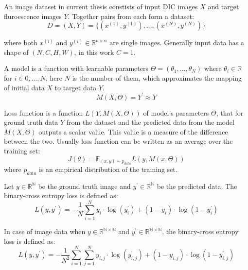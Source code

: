 \begin{definition}
	An image dataset in current thesis constists of input DIC images $X$ and target fluroescence images $Y$. Together pairs from each form a dataset:
	\begin{equation}
		D = (X, Y) = \{(x^{(1)}, y^{(1)}), \dots, (x^{(N)}, y^{(N)})\}
	\end{equation}

	where both $x^{(i)}$ and $y^{(i)} \in \mathbb{R}^{n \times n}$ are single images. Generally input data has a shape of $(N, C, H, W)$, in this work $C = 1$.
\end{definition}


\begin{definition}[Model]
	A model is a function with learnable parameters $\Theta = (\theta_1, ..., \theta_N)$ where $\theta_i \in \mathbb{R}$ for $i \in {0, ..., N}$, here $N$ is the number of them, which approximates the mapping of initial data $X$ to target data $Y$.
	\begin{equation}
		M(X,\Theta) = Y^\prime \approx Y 
	\end{equation}
\end{definition}

\begin{definition}
	Loss function is a function $L(Y, M(X, \Theta))$ of model's parameters $\Theta$, that for ground truth data $Y$ from the dataset and the predicted data from the model $M(X, \Theta)$ outputs a scalar value. This value is a measure of the difference between the two. Usually loss function can be written as an average over the training set:
	\begin{equation}
		J(\theta) = \mathbb{E}_{(x, y)\sim p_{data}} L(y, M(x, \Theta))
	\end{equation}
	where $p_{data}$ is an empirical distribution of the training set.
\end{definition}

\begin{definition}
	Let $y \in \mathbb{R^N}$ be the ground truth image and $y^\prime \in \mathbb{R^N}$ be the predicted data. The binary-cross entropy loss is defined as:
	\begin{equation}
		L(y, y^\prime) = - \frac{1}{N}\sum_{i=1}^{N} y_i \cdot \log(y_i^\prime) +  (1 - y_i) \cdot \log(1 - y_i^\prime) 
	\end{equation}

	In case of image data when $y \in \mathbb{R^{N \times N}}$ and $y^\prime \in \mathbb{R^{N \times N}}$, the binary-cross entropy loss is defined as:
	\begin{equation}
		L(y, y^\prime) = - \frac{1}{N^2}\sum_{i=1}^{N} \sum_{j=1}^{N} y_{i,j} \cdot \log(y_{i, j}^\prime) +  (1 - y_{i, j}) \cdot \log(1 - y_{i, j}^\prime) 
	\end{equation}
\end{definition}

